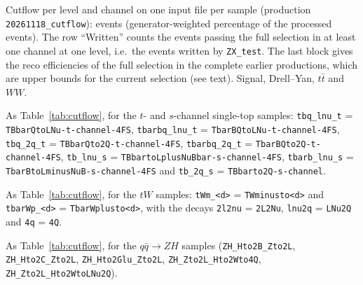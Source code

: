 \documentclass[11pt]{article}
\newcommand{\code}[1]{\texttt{#1}}
\begin{document}
\begin{landscape}
\begin{table}[htbp]
\centering
\caption{Cutflow per level and channel on one input file per sample (production \code{20261118\_cutflow}): events
(generator-weighted percentage of the processed events). The row ``Written'' counts the events passing the full
selection in at least one channel at one level, i.e.\ the events written by \code{ZX\_test}. The last block gives the
reco efficiencies of the full selection in the complete earlier productions, which are upper bounds for the current
selection (see text). Signal, Drell--Yan, $t\bar t$ and $WW$.}
\label{tab:cutflow}
\scriptsize
\setlength{\tabcolsep}{3pt}

\end{table}
\end{landscape}

\begin{landscape}
\begin{table}[htbp]
\centering
\caption{As Table~\ref{tab:cutflow}, for the $t$- and $s$-channel single-top samples:
\code{tbq\_lnu\_t} = \code{TBbarQtoLNu-t-channel-4FS},
\code{tbarbq\_lnu\_t} = \code{TbarBQtoLNu-t-channel-4FS},
\code{tbq\_2q\_t} = \code{TBbarQto2Q-t-channel-4FS},
\code{tbarbq\_2q\_t} = \code{TbarBQto2Q-t-channel-4FS},
\code{tb\_lnu\_s} = \code{TBbartoLplusNuBbar-s-channel-4FS},
\code{tbarb\_lnu\_s} = \code{TbarBtoLminusNuB-s-channel-4FS} and
\code{tb\_2q\_s} = \code{TBbarto2Q-s-channel}.}
\label{tab:cutflowTop}
\scriptsize
\setlength{\tabcolsep}{3pt}

\end{table}
\end{landscape}

\begin{landscape}
\begin{table}[htbp]
\centering
\caption{As Table~\ref{tab:cutflow}, for the $tW$ samples: \code{tWm\_<d>} = \code{TWminusto<d>} and
\code{tbarWp\_<d>} = \code{TbarWplusto<d>}, with the decays \code{2l2nu} = \code{2L2Nu}, \code{lnu2q} = \code{LNu2Q} and
\code{4q} = \code{4Q}.}
\label{tab:cutflowTW}
\scriptsize
\setlength{\tabcolsep}{3pt}

\end{table}
\end{landscape}

\begin{landscape}
\begin{table}[htbp]
\centering
\caption{As Table~\ref{tab:cutflow}, for the $q\bar q\to ZH$ samples (\code{ZH\_Hto2B\_Zto2L}, \code{ZH\_Hto2C\_Zto2L},
\code{ZH\_Hto2Glu\_Zto2L}, \code{ZH\_Zto2L\_Hto2Wto4Q}, \code{ZH\_Zto2L\_Hto2WtoLNu2Q}).}
\label{tab:cutflowZHqq}
\scriptsize
\setlength{\tabcolsep}{3pt}

\end{table}
\end{landscape}
\end{document}
